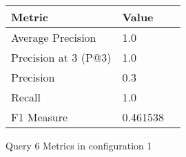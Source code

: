 \begin{figure}[H]
\begin{center}
\begin{tabular}{lll}
\toprule
{}                      Metric &         Value \\
\midrule
     Average Precision &       1.0 \\
  Precision at 3 (P@3) &       1.0 \\
             Precision &       0.3 \\
                Recall &       1.0 \\
            F1 Measure &  0.461538 \\
\bottomrule
\end{tabular}
\end{center}
\caption{Query 6 Metrics in configuration 1}
\label{fig:query_6_metrics_config_1}
\end{figure}